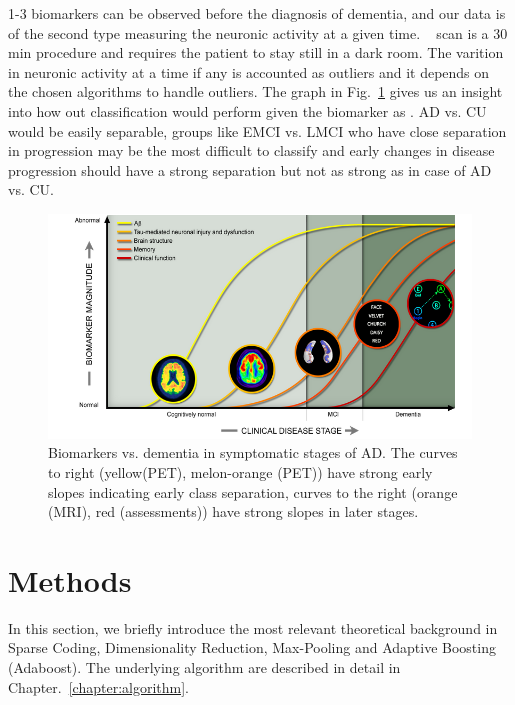 1-3 biomarkers can be observed before the diagnosis of dementia, and our data is of the second type measuring the neuronic activity at a given time. \FDGPET~ scan is a 30 min procedure and requires the patient to stay still in a dark room. The varition in neuronic activity at a time if any is accounted as outliers and it depends on the chosen algorithms to handle outliers. The graph in Fig.~\ref{fig:biomarker} gives us an insight into how out classification would perform given the biomarker as \FDGPET. AD vs. CU would be easily separable, groups like EMCI vs. LMCI who have close separation in progression may be the most difficult to classify and early changes in disease progression should have a strong separation but not as strong as in case of AD vs. CU.        

\begin{figure}[h]
	\centering
	\includegraphics[width=\linewidth]{figures/biomarker}
	\caption[Biomarkers vs. Dementia]{Biomarkers vs. dementia in symptomatic stages of AD. The curves to right (yellow(PET), melon-orange (PET)) have strong early slopes indicating early class separation, curves to the right (orange (MRI), red (assessments)) have strong slopes in later stages.}
	\label{fig:biomarker}
\end{figure}


\section{Methods}
\label{sec:theoritical_background}

In this section, we briefly introduce the most relevant theoretical background in Sparse Coding, Dimensionality Reduction, Max-Pooling and Adaptive Boosting (Adaboost). The underlying algorithm are described in detail in Chapter.~\ref{chapter:algorithm}.

